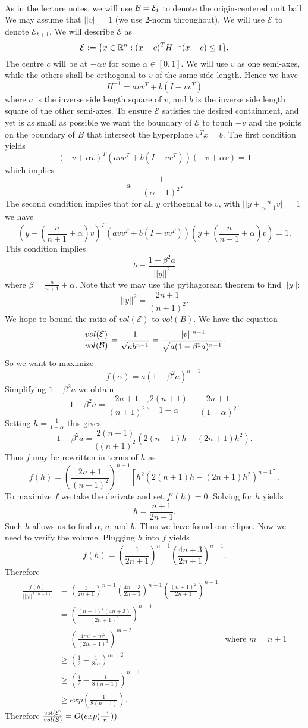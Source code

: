 \documentclass[letterpaper,12pt,oneside,onecolumn]{article}
\newcommand{\cE}{\mathcal{E}} \newcommand{\cF}{\mathcal{F}}
\begin{document}
\paragraph{}
As in the lecture notes, we will use $\cB = \cE_t$ to denote the origin-centered unit ball. We may assume that $||v|| =1$ (we use $2$-norm throughout). We will use $\cE$ to denote $\cE_{t+1}$. We will describe $\cE$ as 
$$\cE := \{x \in \R^n : (x-c)^TH^{-1}(x-c) \leq 1\}.$$
The centre $c$ will be at $-\alpha v$ for some $\alpha \in [0,1]$. We will use $v$ as one semi-axes, while the others shall be orthogonal to $v$ of the same side length. Hence we have
$$H^{-1} = avv^T + b(I - vv^T)$$
where $a$ is the inverse side length square of $v$, and $b$ is the inverse side length square of the other semi-axes. To ensure $\cE$ satisfies the desired containment, and yet is as small as possible we want the boundary of $\cE$ to touch $-v$ and the points on the boundary of $B$ that intersect the hyperplane $v^Tx = b$. The first condition yields
$$(-v+\alpha v)^T(avv^T + b(I-vv^T))(-v+\alpha v) = 1$$
which implies
$$a = \frac{1}{(\alpha-1)^2}.$$
The second condition implies that for all $y$ orthogonal to $v$, with $||y + \frac{n}{n+1}v || =1$ we have
$$(y + (\frac{n}{n+1} + \alpha)v)^T(avv^T + b(I-vv^T))(y+(\frac{n}{n+1} + \alpha)v) = 1.$$
This condition implies
$$ b = \frac{1-\beta^2a}{||y||^2}$$
where $\beta = \frac{n}{n+1} + \alpha.$ Note that we may use the pythagorean theorem to find $||y||$:
$$||y||^2 =\frac{2n+1}{(n+1)^2}.$$ 
We hope to bound the ratio of $vol(\cE)$ to $vol(B)$. We have the equation
$$\frac{vol(\cE)}{vol(\cB)} = \frac{1}{\sqrt{ab^{n-1}}} = \frac{||v||^{n-1}}{\sqrt{a(1-\beta^2a)^{n-1}}}.$$
So we want to maximize
$$f(\alpha) = a(1-\beta^2a)^{n-1}.$$
Simplifying $1-\beta^2a$ we obtain
$$1-\beta^2a = \frac{2n+1}{(n+1)^2}(\frac{2(n+1)}{1-\alpha} - \frac{2n+1}{(1-\alpha)^2}.$$
Setting $h = \frac{1}{1-\alpha}$ this gives
$$1-\beta^2a = \frac{2(n+1)}{((n+1)^2}(2(n+1)h - (2n+1)h^2).$$
Thus $f$ may be rewritten in terms of $h$ as
$$f(h) = (\frac{2n+1}{(n+1)^2})^{n-1}[h^2(2(n+1)h - (2n+1)h^2)^{n-1}].$$
To maximize $f$ we take the derivate and set $f'(h) = 0$. Solving for $h$ yields
$$h = \frac{n+1}{2n+1}.$$
Such $h$ allows us to find $\alpha$, $a$, and $b$. Thus we have found our ellipse. Now we need to verify the volume. Plugging $h$ into $f$ yields
$$f(h) = (\frac{1}{2n+1})^{n-1}(\frac{4n+3}{2n+1})^{n-1}.$$
Therefore
\begin{align*}
\frac{f(h)}{||y||^{2(n-1)}} &= (\frac{1}{2n+1})^{n-1}(\frac{4n+3}{2n+1})^{n-1}(\frac{(n+1)^2}{2n+1})^{n-1} \\
&=(\frac{(n+1)^2(4n+3)}{(2n+1)^3})^{n-1} \\
&= (\frac{4m^3 - m^2}{(2m-1)^3})^{m-2} &\text{where $m=n+1$} \\
&\geq (\frac{1}{2} - \frac{1}{8m})^{m-2} \\
&\geq (\frac{1}{2}- \frac{1}{8(n-1)})^{n-1} \\
&\geq exp(\frac{1}{8(n-1)}).
\end{align*}
Therefore $\frac{vol(\cE)}{vol(\cB)} = O(exp(\frac{-1}{n})).$
\end{document}
